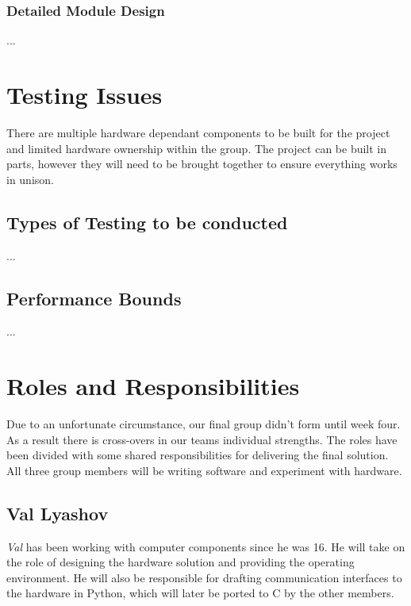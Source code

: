 \documentclass[11pt,a4paper,titlepage]{report}
\begin{document}
\subsubsection{Detailed Module Design}

...


\section{Testing Issues}

There are multiple hardware dependant components to be built for the project and limited hardware ownership within the group. The project can be built in parts, however they will need to be brought together to ensure everything works in unison. 

\subsection{Types of Testing to be conducted}

...

\subsection{Performance Bounds}

...




\section{Roles and Responsibilities}



Due to an unfortunate circumstance, our final group didn't form until week four. As a result there is cross-overs in our teams individual strengths. The roles have been divided with some shared responsibilities for delivering the final solution. All three group members will be writing software and experiment with hardware.


\subsection{Val Lyashov}
\textit{Val} has been working with computer components since he was 16. He will take on the role of designing the hardware solution and providing the operating environment. He will also be responsible for drafting communication interfaces to the hardware in Python, which will later be ported to C by the other members.
\end{document}
